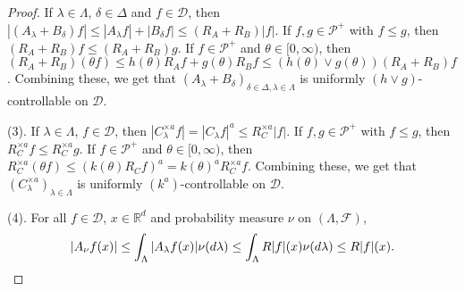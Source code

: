 \documentclass[12pt,a4paper]{amsart}
\theoremstyle{plain}
\theoremstyle{definition}
\numberwithin{equation}{section}
\begin{document}
\begin{proof}
If $\lambda \in \Lambda$, $\delta \in \Delta$ and $f\in \mathcal D$, then $|(A_\lambda + B_\delta) f| \leq |A_\lambda f| + |B_\delta f| \leq (R_A + R_B) |f|$.
If $f,g \in \mathcal P^+$ with $f\leq g$, then $(R_A + R_B)f \leq (R_A + R_B) g$.
If $f \in \mathcal P^+$ and $\theta \in [0,\infty)$, then $(R_A + R_B) (\theta f) \leq h(\theta) R_Af + g(\theta) R_Bf \leq (h(\theta) \vee g(\theta)) (R_A+R_B)f $.
Combining these, we get that $(A_\lambda + B_\delta)_{\delta\in \Delta, \lambda \in \Lambda}$ is uniformly $(h \vee g)$-controllable on $\mathcal D$.

    (3). 
If $\lambda \in \Lambda$, $f\in \mathcal D$, then $|C_\lambda^{\times a} f| = |C_\lambda f|^a  \leq R_C^{\times a} |f|$.
If $f,g \in \mathcal P^+$ with $f\leq g$, then $R_C^{\times a}f \leq R_C^{\times a} g$.
If $f \in \mathcal P^+$ and $\theta \in [0,\infty)$, then $R_C^{\times a}(\theta f) \leq (k(\theta) R_C f)^a = k(\theta)^a R_C^{\times a}f$.
Combining these, we get that $(C_\lambda^{\times a})_{\lambda \in \Lambda}$ is uniformly $(k^a)$-controllable on $\mathcal D$.

    (4).     
    For all $f \in \mathcal{D}$, $x\in \mathbb R^d$ and  probability measure $\nu$ on $(\Lambda, \mathscr F)$,
\[
    |A_{\nu}f(x)|\leq \int_{\Lambda}|A_{\lambda}f(x)|\nu(d\lambda) \leq \int_{\Lambda}R|f|(x)\nu(d\lambda) \leq R|f|(x). \qedhere
\]
\end{proof}
\end{document}
